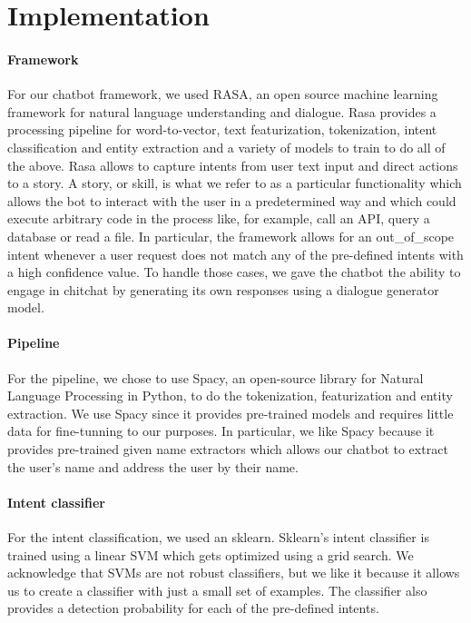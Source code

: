 \documentclass[11pt,a4paper]{article}
\begin{document}
\section{Implementation}

\paragraph{Framework} For our chatbot framework, we used RASA, an open source machine learning framework for natural language understanding and dialogue. Rasa provides a processing pipeline for word-to-vector, text featurization, tokenization, intent classification and entity extraction and a variety of models to train to do all of the above. Rasa allows to capture intents from user text input and direct actions to a story. A story, or skill, is what we refer to as a particular functionality which allows the bot to interact with the user in a predetermined way and which could execute arbitrary code in the process like, for example, call an API, query a database or read a file. In particular, the framework allows for an out\_of\_scope intent whenever a user request does not match any of the pre-defined intents with a high confidence value. To handle those cases, we gave the chatbot the ability to engage in chitchat by generating its own responses using a dialogue generator model.

\paragraph{Pipeline}

For the pipeline, we chose to use Spacy, an open-source library for Natural Language Processing in Python, to do the tokenization, featurization and entity extraction. We use Spacy since it provides pre-trained models and requires little data for fine-tunning to our purposes. In particular, we like Spacy because it provides pre-trained given name extractors which allows our chatbot to extract the user's name and address the user by their name. 

\paragraph{Intent classifier}

For the intent classification, we used an sklearn. Sklearn's intent classifier is trained using a linear SVM which gets optimized using a grid search. We acknowledge that SVMs are not robust classifiers, but we like it because it allows us to create a classifier with just a small set of examples. The classifier also provides a detection probability for each of the pre-defined intents. 
\end{document}
